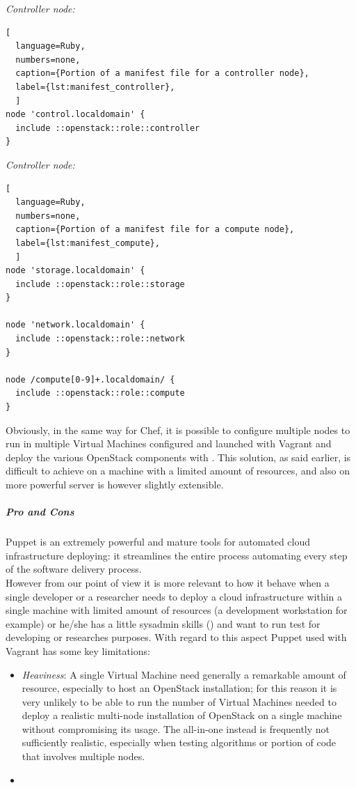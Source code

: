 \textit{Controller node:}
\begin{lstlisting}[
  language=Ruby,
  numbers=none,
  caption={Portion of a manifest file for a controller node},
  label={lst:manifest_controller},
  ]
node 'control.localdomain' {
  include ::openstack::role::controller
}
\end{lstlisting}

\textit{Controller node:}
\begin{lstlisting}[
  language=Ruby,
  numbers=none,
  caption={Portion of a manifest file for a compute node},
  label={lst:manifest_compute},
  ]
node 'storage.localdomain' {
  include ::openstack::role::storage
}

node 'network.localdomain' {
  include ::openstack::role::network
}

node /compute[0-9]+.localdomain/ {
  include ::openstack::role::compute
}
\end{lstlisting}

Obviously, in the same way for Chef, it is possible to configure multiple nodes to run in multiple Virtual Machines configured and launched with Vagrant and deploy the various OpenStack components with . This solution, as said earlier, is difficult to achieve on a machine with a limited amount of resources, and also on more powerful server is however slightly extensible.

\subparagraph{Pro and Cons}
\label{subp:sota_puppet_pro_cons}
Puppet is an extremely powerful and mature tools for automated cloud infrastructure deploying: it streamlines the entire process automating every step of the software delivery process.\\
However from our point of view it is more relevant to how it behave when a single developer or a researcher needs to deploy a cloud infrastructure within a single machine with limited amount of resources (a development workstation for example) or he/she has a little sysadmin skills () and want to run test for developing or researches purposes. With regard to this aspect Puppet used with Vagrant has some key limitations:

\begin{itemize}
\item \textit{Heaviness}: A single Virtual Machine need generally a remarkable amount of resource, especially to host an OpenStack installation; for this reason it is very unlikely to be able to run the number of Virtual Machines needed to deploy a realistic multi-node installation of OpenStack on a single machine without compromising its usage. The all-in-one instead is frequently not sufficiently realistic, especially when testing algorithms or portion of code that involves multiple nodes.
\item {}
\end{itemize}

